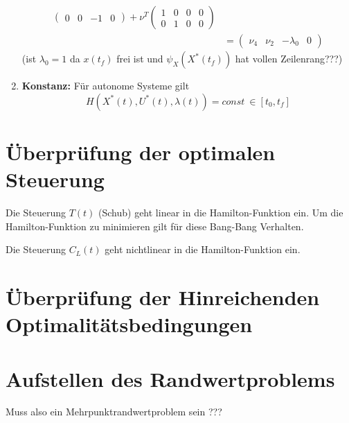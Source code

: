 \begin{enumerate}
\[\begin{split}
\begin{pmatrix}
0 & 0 & -1 & 0
\end{pmatrix}  + \nu^T \begin{pmatrix}
1 & 0 & 0 & 0 \\
0 & 1 & 0 & 0 
\end{pmatrix}  \\\
&= \begin{pmatrix}
\nu_4 & \nu_2 & -\lambda_0 & 0 
\end{pmatrix}
\end{split}\]
(ist $\lambda_{0} =1$ da $x(t_f)$ frei ist und $\psi_X(X^{\ast}(t_f))$ hat vollen Zeilenrang???) 
%
\item \textbf{Konstanz:} Für autonome Systeme gilt \[H(X^{\ast}(t),U^{\ast}(t), \lambda(t)) = const \ \in [t_0,t_f]\]
\end{enumerate}

































\newpage
\section{Überprüfung der optimalen Steuerung}
Die Steuerung $T(t)$ (Schub) geht linear in die Hamilton-Funktion ein. Um die Hamilton-Funktion zu minimieren gilt für diese Bang-Bang Verhalten.

Die Steuerung $C_L(t)$ geht nichtlinear in die Hamilton-Funktion ein.






\section{Überprüfung der Hinreichenden Optimalitätsbedingungen}







\section{Aufstellen des Randwertproblems}
Muss also ein Mehrpunktrandwertproblem sein ???


